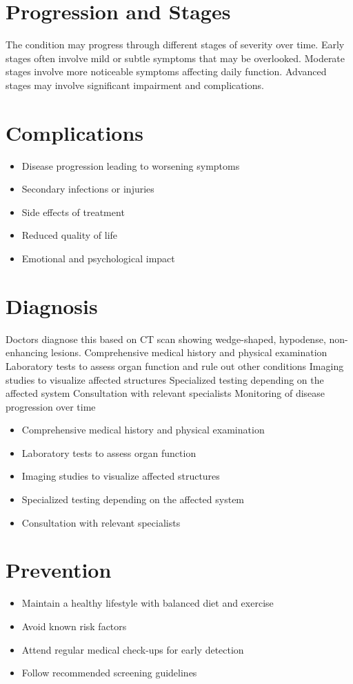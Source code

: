 \section{Progression and Stages}
The condition may progress through different stages of severity over time. Early stages often involve mild or subtle symptoms that may be overlooked. Moderate stages involve more noticeable symptoms affecting daily function. Advanced stages may involve significant impairment and complications.
\section{Complications}
\begin{itemize}[noitemsep]
  \item Disease progression leading to worsening symptoms
  \item Secondary infections or injuries
  \item Side effects of treatment
  \item Reduced quality of life
  \item Emotional and psychological impact
\end{itemize}
\section{Diagnosis}
Doctors diagnose this based on CT scan showing wedge-shaped, hypodense, non-enhancing lesions. Comprehensive medical history and physical examination Laboratory tests to assess organ function and rule out other conditions Imaging studies to visualize affected structures Specialized testing depending on the affected system Consultation with relevant specialists Monitoring of disease progression over time

\begin{itemize}[noitemsep]
  \item Comprehensive medical history and physical examination
  \item Laboratory tests to assess organ function
  \item Imaging studies to visualize affected structures
  \item Specialized testing depending on the affected system
  \item Consultation with relevant specialists
\end{itemize}
\section{Prevention}
\begin{itemize}[noitemsep]
  \item Maintain a healthy lifestyle with balanced diet and exercise
  \item Avoid known risk factors
  \item Attend regular medical check-ups for early detection
  \item Follow recommended screening guidelines
\end{itemize}
